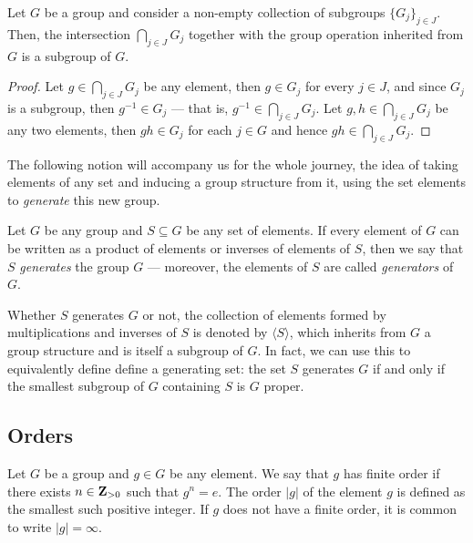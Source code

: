 \begin{corollary}
\label{cor:intersection-subgroups}
Let \(G\) be a group and consider a non-empty collection of subgroups
\(\{G_{j}\}_{j \in J}\). Then, the intersection \(\bigcap_{j \in J} G_j\) together with
the group operation inherited from \(G\) is a subgroup of \(G\).
\end{corollary}

\begin{proof}
Let \(g \in \bigcap_{j \in J} G_j\) be any element, then \(g \in G_j\) for every
\(j \in J\), and since \(G_j\) is a subgroup, then \(g^{-1} \in G_j\) --- that
is, \(g^{-1} \in \bigcap_{j \in J} G_j\). Let \(g, h \in \bigcap_{j \in J} G_j\) be
any two elements, then \(gh \in G_j\) for each \(j \in G\) and hence \(g h \in
\bigcap_{j \in J} G_j\).
\end{proof}

The following notion will accompany us for the whole journey, the idea of taking
elements of any set and inducing a group structure from it, using the set
elements to \emph{generate} this new group.

\begin{definition}[Generators]
\label{def:generator-group}
Let \(G\) be any group and \(S \subseteq G\) be any set of elements. If every
element of \(G\) can be written as a product of elements or inverses of elements
of \(S\), then we say that \(S\) \emph{generates} the group \(G\) --- moreover,
the elements of \(S\) are called \emph{generators} of \(G\).

Whether \(S\) generates \(G\) or not, the collection of elements formed by
multiplications and inverses of \(S\) is denoted by \(\langle S \rangle\), which
inherits from \(G\) a group structure and is itself a subgroup of \(G\). In
fact, we can use this to equivalently define define a generating set: the set
\(S\) generates \(G\) if and only if the smallest subgroup of \(G\) containing
\(S\) is \(G\) proper.
\end{definition}

\subsection{Orders}

\begin{definition}\label{def: group elem order}
Let \(G\) be a group and \(g \in G\) be any element. We say that \(g\) has
finite order if there exists \(n \in \mathbf{Z}_{> 0}\) such that \(g^n = e\).
The order \(|g|\) of the element \(g\) is defined as the smallest such
positive integer. If \(g\) does not have a finite order, it is common to write
  \(|g| = \infty\).
\end{definition}

